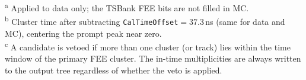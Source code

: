 \begin{table}[htbp]
  \vspace{2pt}
  \begin{flushleft}\footnotesize
  \textsuperscript{a} Applied to data only; the TSBank FEE bits are not filled in MC.\\
  \textsuperscript{b} Cluster time after subtracting \texttt{CalTimeOffset}$=37.3$\,ns
      (same for data and MC), centering the prompt peak near zero.\\
  \textsuperscript{c} A candidate is vetoed if more than one cluster (or track) lies
      within the time window of the primary FEE cluster. The in-time multiplicities
      are always written to the output tree regardless of whether the veto is applied.
  \end{flushleft}
\end{table}
